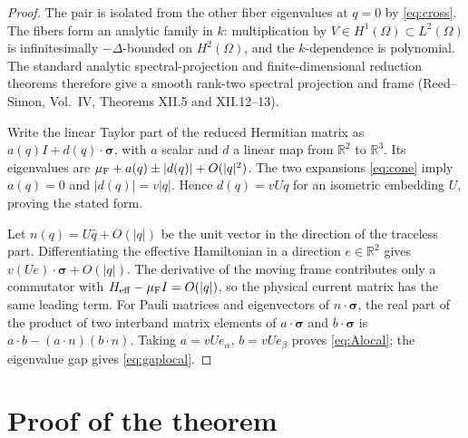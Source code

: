 \documentclass[11pt,a4paper]{article}
\newcommand{\R}{\mathbb R}
\begin{document}
\begin{proof}
The pair is isolated from the other fiber eigenvalues at $q=0$ by
\eqref{eq:cross}. The fibers form an analytic family in $k$: multiplication
by $V\in H^1(\Omega)\subset L^2(\Omega)$ is infinitesimally
$-\Delta$-bounded on $H^2(\Omega)$, and the $k$-dependence is polynomial.
The standard analytic spectral-projection and finite-dimensional reduction
theorems therefore give a smooth rank-two spectral projection and frame
(Reed--Simon, Vol.~IV, Theorems XII.5 and XII.12--13).

Write the linear Taylor part of the reduced Hermitian matrix as
$a(q)I+d(q)\cdot\boldsymbol\sigma$, with $a$ scalar and $d$ a linear map
from $\R^2$ to $\R^3$. Its eigenvalues are
$\mu_{\rm F}+a(q)\pm|d(q)|+O(|q|^2)$. The two expansions
\eqref{eq:cone} imply $a(q)=0$ and $|d(q)|=v|q|$. Hence
$d(q)=vUq$ for an isometric embedding $U$, proving the stated form.

Let $n(q)=U\widehat q+O(|q|)$ be the unit vector in the direction of the
traceless part. Differentiating the effective Hamiltonian in a direction
$e\in\R^2$ gives $v(Ue)\cdot\boldsymbol\sigma+O(|q|)$. The derivative of
the moving frame contributes only a commutator with
$H_{\rm eff}-\mu_{\rm F}I=O(|q|)$, so the physical current matrix has the
same leading term. For Pauli matrices and eigenvectors of
$n\cdot\boldsymbol\sigma$, the real part of the product of two interband
matrix elements of $a\cdot\boldsymbol\sigma$ and $b\cdot\boldsymbol\sigma$
is $a\cdot b-(a\cdot n)(b\cdot n)$. Taking
$a=vUe_\alpha$, $b=vUe_\beta$ proves \eqref{eq:Alocal}; the eigenvalue gap
gives \eqref{eq:gaplocal}.
\end{proof}

\section{Proof of the theorem}
\end{document}
